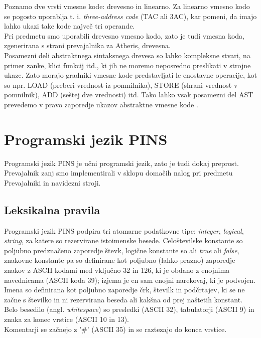 \documentclass[a4paper, 12p]{book}
\begin{document}
Poznamo dve vrsti vmesne kode: drevesno in linearno. Za linearno vmesno kodo se pogosto uporablja t. i. \textit{three-address code} (TAC ali 3AC), kar pomeni, da imajo lahko ukazi take kode največ tri operande. \\
\indent Pri predmetu smo uporabili drevesno vmesno kodo, zato je tudi vmesna koda, zgenerirana s strani prevajalnika za Atheris, drevesna.\\
\indent Posamezni deli abstraktnega sintaksnega drevesa so lahko kompleksne stvari, na primer zanke, klici funkcij itd., ki jih ne moremo neposredno preslikati v strojne ukaze. Zato morajo gradniki vmesne kode predstavljati le enostavne operacije, kot so npr. LOAD (preberi vrednost iz pomnilnika), STORE (shrani vrednost v pomnilnik), ADD (seštej dve vrednosti) itd. Tako lahko vsak posamezni del AST prevedemo v pravo zaporedje ukazov abstraktne vmesne kode \cite{modernCompiler}. \\ 

\chapter{Programski jezik PINS}

Programski jezik PINS je učni programski jezik, zato je tudi dokaj preprost. Prevajalnik zanj smo implementirali v sklopu domačih nalog pri predmetu Prevajalniki in navidezni stroji.

\section{Leksikalna pravila}

Programski jezik PINS podpira tri atomarne podatkovne tipe: \textit{integer}, \textit{logical}, \textit{string}, za katere so rezervirane istoimenske besede. Celoštevilske konstante so poljubno predznačeno zaporedje števk, logične konstante so ali \textit{true} ali \textit{false}, znakovne konstante pa so definirane kot poljubno (lahko prazno) zaporedje znakov z ASCII kodami med vključno 32 in 126, ki je obdano z enojnima navednicama (ASCII koda 39); izjema je en sam enojni narekovaj, ki je podvojen. \\
\indent Imena so definirana kot poljubno zaporedje črk, številk in podčrtajev, ki se ne začne s številko in ni rezervirana beseda ali kakšna od prej naštetih konstant. \\
\indent Belo besedilo (angl. \textit{whitespace}) so presledki (ASCII 32), tabulatorji (ASCII 9) in znaka za konec vrstice (ASCII 10 in 13). \\
\indent Komentarji se začnejo z '\#' (ASCII 35) in se raztezajo do konca vrstice.
\end{document}
